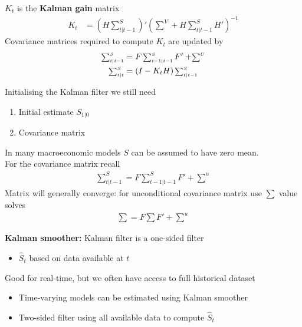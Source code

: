 \documentclass{beamer}
\begin{document}
\begin{frame}
  $K_t$ is the \textbf{Kalman gain} matrix
  \begin{align}
    K_t&= \left(H\scriptstyle \sum^S_{t|t-1} \right)' \left( \scriptstyle \sum^V + \textstyle H\scriptstyle \sum^S_{t|t-1} \textstyle H'\right )^{-1} 
  \end{align}
  \medskip
  Covariance matrices required to compute $K_t$ are updated by 
  \begin{align}
    \scriptstyle \sum^S_{t|t-1} \textstyle &= F\scriptstyle \sum^S_{t-1|t-1}\textstyle F'+ \scriptstyle\sum^U\\
    \scriptstyle \sum^S_{t|t} \textstyle &= (I-K_tH)\scriptstyle \sum^S_{t|t-1}
  \end{align}
\end{frame}


\begin{frame}
  Initialising the Kalman filter we still need
  \begin{enumerate}
    \item Initial estimate $S_{1|0}$
    \item Covariance matrix
  \end{enumerate}
  \medskip
  In many macroeconomic models $S$ can be assumed to have zero mean. \\
  For the covariance matrix recall
  \begin{align}
    \scriptstyle \sum^S_{t|t-1} = \textstyle F \scriptstyle \sum^S_{t-1|t-1} \textstyle F' + \scriptstyle \sum^u
  \end{align}
  Matrix will generally converge: for unconditional covariance matrix use $\sum$ value solves
  \begin{align}
    \scriptstyle \sum=\textstyle F \scriptstyle \sum \textstyle F' + \scriptstyle \sum^u
  \end{align}
\end{frame}

\begin{frame}
  \textbf{Kalman smoother:} Kalman filter is a one-sided filter
  \begin{itemize}
    \item $\hat{S}_t$ based on data available at $t$ 
  \end{itemize}
  \medskip
  Good for real-time, but we often have access to full historical dataset
  \begin{itemize}
    \item Time-varying models can be estimated using Kalman smoother
    \item Two-sided filter using all available data to compute $\hat{S}_t$
  \end{itemize}  
\end{frame}
\end{document}
